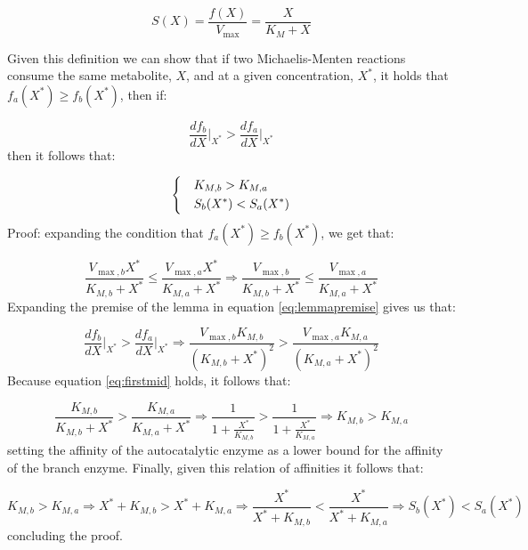     \begin{equation*}
      S(X)=\frac{f(X)}{V_{\max}}=\frac{X}{K_M+X}
    \end{equation*}

    Given this definition we can show that if two Michaelis-Menten reactions consume the same metabolite, $X$, and at a given concentration, $X^*$, it holds that $f_a(X^*)\geq f_b(X^*)$, then if:

    \begin{equation}
        \frac{df_b}{dX}\Big\vert_{X^*}>\frac{df_a}{dX}\Big\vert_{X^*}
        \label{eq:lemmapremise}
    \end{equation}
    then it follows that:

    \begin{equation*}
    \begin{dcases}
      & K_{M,b}>K_{M,a} \\
      & S_b(X^*)<S_a(X^*)
    \end{dcases}
    \end{equation*}
    Proof: expanding the condition that $f_a(X^*)\geq f_b(X^*)$, we get that:

    \begin{equation}
        \frac{V_{\max,b}X^*}{K_{M,b}+X^*}\leq\frac{V_{\max,a}X^*}{K_{M,a}+X^*} \Rightarrow
         \frac{V_{\max,b}}{K_{M,b}+X^*}\leq\frac{V_{\max,a}}{K_{M,a}+X^*}
         \label{eq:firstmid}
     \end{equation}
     Expanding the premise of the lemma in equation \ref{eq:lemmapremise} gives us that:

     \begin{equation*}
        \frac{df_b}{dX}\Big\vert_{X^*}>\frac{df_a}{dX}\Big\vert_{X^*} \Rightarrow
        \frac{V_{\max,b}K_{M,b}}{(K_{M,b}+X^*)^2} > \frac{V_{\max,a}K_{M,a}}{(K_{M,a}+X^*)^2}
     \end{equation*}
     Because equation \ref{eq:firstmid} holds, it follows that:

     \begin{equation*}
         \frac{K_{M,b}}{K_{M,b}+X^*} > \frac{K_{M,a}}{K_{M,a}+X^*} \Rightarrow \frac{1}{1+\frac{X^*}{K_{M,b}}} > \frac{1}{1+\frac{X^*}{K_{M,a}}} \Rightarrow K_{M,b}>K_{M,a}
     \end{equation*}
    setting the affinity of the autocatalytic enzyme as a lower bound for the affinity of the branch enzyme.
    Finally, given this relation of affinities it follows that:

    \begin{equation*}
        K_{M,b}>K_{M,a} \Rightarrow X^*+K_{M,b}>X^*+K_{M,a} \Rightarrow \frac{X^*}{X^*+K_{M,b}}<\frac{X^*}{X^*+K_{M,a} } \Rightarrow S_b(X^*)<S_a(X^*)
    \end{equation*}
    concluding the proof.


